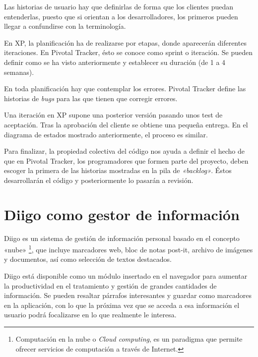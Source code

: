     Las historias de usuario hay que definirlas de forma que los clientes puedan entenderlas, puesto que si orientan a los desarrolladores, los primeros pueden llegar a confundirse con la terminología.

    En XP, la planificación ha de realizarse por etapas, donde aparecerán diferentes iteraciones. En Pivotal Tracker, ésto se conoce como sprint o iteración. Se pueden definir como se ha visto anteriormente y establecer su duración (de 1 a 4 semanas). 

    En toda planificación hay que contemplar los errores. Pivotal Tracker define las historias de {\it bugs} para las que tienen que corregir errores. 

    Una iteración en XP supone una posterior versión pasando unos test de aceptación. Tras la aprobación del cliente se obtiene una pequeña entrega. En el diagrama de estados mostrado anteriormente, el proceso es similar.

    Para finalizar, la propiedad colectiva del código nos ayuda a definir el hecho de que en Pivotal Tracker, los programadores que formen parte del proyecto, deben escoger la primera de las historias mostradas en la pila de {\it «backlog»}. Éstos desarrollarán el código y posteriormente lo pasarán a revisión.
  


\section{Diigo como gestor de información} %
  \label{sec:diigo_como_gestor_de_informacion}

  Diigo es un sistema de gestión de información personal basado en el concepto «nube» \footnote{Computación en la nube o {\it Cloud computing}, es un paradigma que permite ofrecer servicios de computación a través de Internet.}, que incluye marcadores web, bloc de notas post-it, archivo de imágenes y documentos, así como selección de textos destacados.

  Diigo está disponible como un módulo insertado en el navegador para aumentar la productividad en el tratamiento y gestión de grandes cantidades de información. Se pueden resaltar párrafos interesantes y guardar como marcadores en la aplicación, con lo que la próxima vez que se acceda a esa información el usuario podrá focalizarse en lo que realmente le interesa.
  
